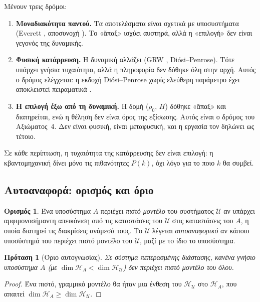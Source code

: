 \documentclass[a4paper,11pt]{article}
\newtheorem{prop}{Πρόταση}
\theoremstyle{definition}
\newtheorem{defn}{Ορισμός}
\begin{document}
Μένουν τρεις δρόμοι:
\begin{enumerate}
\item \textbf{Μοναδιακότητα παντού.} Τα αποτελέσματα είναι σχετικά με υποσυστήματα (Everett \cite{everett}, αποσυνοχή \cite{zurek}). Το «ἅπαξ» ισχύει αυστηρά, αλλά η «επιλογή» δεν είναι γεγονός της δυναμικής.
\item \textbf{Φυσική κατάρρευση.} Η δυναμική αλλάζει (GRW \cite{grw}, Diósi–Penrose). Τότε υπάρχει γνήσια τυχαιότητα, αλλά η πληροφορία δεν δόθηκε όλη στην αρχή. Αυτός ο δρόμος ελέγχεται: η εκδοχή Diósi–Penrose χωρίς ελεύθερη παράμετρο έχει αποκλειστεί πειραματικά \cite{donadi}.
\item \textbf{Η επιλογή έξω από τη δυναμική.} Η δομή ($\rho_0$, $H$) δόθηκε «ἅπαξ» και διατηρείται, ενώ η θέληση δεν είναι όρος της εξίσωσης. Αυτός είναι ο δρόμος του Αξιώματος~4. Δεν είναι φυσική, είναι μεταφυσική, και η εργασία τον δηλώνει ως τέτοιο.
\end{enumerate}

Σε κάθε περίπτωση, η τυχαιότητα της κατάρρευσης δεν είναι επιλογή: η κβαντομηχανική δίνει μόνο τις πιθανότητες $P(k)$, όχι λόγο για το ποιο $k$ θα συμβεί.

\subsection{Αυτοαναφορά: ορισμός και όριο}\label{sec:self}

\begin{defn}
Ένα υποσύστημα $A$ περιέχει \emph{πιστό μοντέλο} του συστήματος $\mathcal U$ αν υπάρχει αμφιμονοσήμαντη απεικόνιση από τις καταστάσεις του $\mathcal U$ στις καταστάσεις του $A$, η οποία διατηρεί τις διακρίσεις ανάμεσά τους. Το $\mathcal U$ λέγεται \emph{αυτοαναφορικό} αν κάποιο υποσύστημά του περιέχει πιστό μοντέλο του $\mathcal U$, μαζί με το ίδιο το υποσύστημα.
\end{defn}

\begin{prop}[Όριο αυτογνωσίας]\label{prop:self}
Σε σύστημα πεπερασμένης διάστασης, κανένα γνήσιο υποσύστημα $A$ (με $\dim\mathcal H_A<\dim\mathcal H_{\mathcal U}$) δεν περιέχει πιστό μοντέλο του όλου.
\end{prop}
\begin{proof}
Ένα πιστό, γραμμικό μοντέλο θα ήταν μια ένθεση του $\mathcal H_{\mathcal U}$ στο $\mathcal H_A$, που απαιτεί $\dim\mathcal H_A\ge\dim\mathcal H_{\mathcal U}$.
\end{proof}
\end{document}

